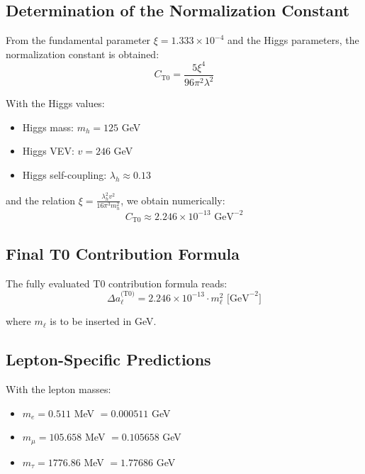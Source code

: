 	\subsection{Determination of the Normalization Constant}
	
	From the fundamental parameter $\xi = 1.333 \times 10^{-4}$ and the Higgs parameters, the normalization constant is obtained:
	\begin{equation}
		C_{\text{T0}} = \frac{5\xi^4}{96\pi^2\lambda^2}
		\label{eq:normalization_constant}
	\end{equation}
	
	With the Higgs values:
	\begin{itemize}
		\item Higgs mass: $m_h = 125$ GeV
		\item Higgs VEV: $v = 246$ GeV  
		\item Higgs self-coupling: $\lambda_h \approx 0.13$
	\end{itemize}
	
	and the relation $\xi = \frac{\lambda_h^2 v^2}{16\pi^3 m_h^2}$, we obtain numerically:
	\begin{equation}
		C_{\text{T0}} \approx 2.246 \times 10^{-13} \text{ GeV}^{-2}
		\label{eq:numerical_constant}
	\end{equation}
	
	\subsection{Final T0 Contribution Formula}
	
	The fully evaluated T0 contribution formula reads:
	\begin{equation}
		\boxed{\Delta a_\ell^{\text{(T0)}} = 2.246 \times 10^{-13} \cdot m_\ell^2 \text{ [GeV}^{-2}\text{]}}
		\label{eq:final_t0_formula}
	\end{equation}
	
	where $m_\ell$ is to be inserted in GeV.
	
	\subsection{Lepton-Specific Predictions}
	
	With the lepton masses:
	\begin{itemize}
		\item $m_e = 0.511$ MeV $= 0.000511$ GeV
		\item $m_\mu = 105.658$ MeV $= 0.105658$ GeV
		\item $m_\tau = 1776.86$ MeV $= 1.77686$ GeV
	\end{itemize}
	
